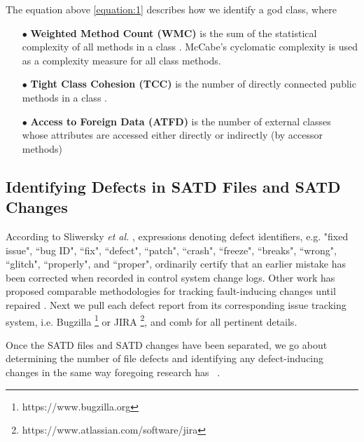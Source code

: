 The equation above \ref{equation:1} describes how we identify a god class, where 


\begin{itemize}
\item[$\bullet$] \textbf{Weighted Method Count (WMC)} is the sum of the statistical complexity of all methods in a class \cite{Chidamber_Kemerer_94}. McCabe’s cyclomatic complexity \cite{McCabe_1976} is used as a complexity measure for all class methods.
\item[$\bullet$] \textbf{Tight Class Cohesion (TCC)} is the number of directly connected public methods in a class \cite{Bieman:1995:CRO:223427.211856}.
\item[$\bullet$] \textbf{Access to Foreign Data (ATFD)} is the number of external classes whose attributes are accessed either directly or indirectly (by accessor methods) \cite{Marinescu_PhD}
\end{itemize}

\subsection{Identifying Defects in SATD Files and SATD Changes}
\label{ch4_bugs_td}

According to Sliwersky \textit{et al.} \cite{sliwerski-msr-2005}, expressions denoting defect identifiers, e.g. "fixed issue", ``bug ID", ``fix", ``defect", ``patch", ``crash", ``freeze", ``breaks", ``wrong", ``glitch", ``properly", and ``proper", ordinarily certify that an earlier mistake has been corrected when recorded in control system change logs. Other work has proposed comparable methodologies for tracking fault-inducing changes until repaired \cite{Kamei-tse-2013, Kim-tse-2008, sliwerski-msr-2005}. Next we pull each defect report from its corresponding issue tracking system, i.e. Bugzilla \footnote{https://www.bugzilla.org} or JIRA \footnote{https://www.atlassian.com/software/jira}, and comb for all pertinent details.


Once the SATD files and SATD changes have been separated, we go about determining the number of file defects and identifying any defect-inducing changes in the same way foregoing research has ~\cite{Kamei-tse-2013, Kim-tse-2008, sliwerski-msr-2005}.

